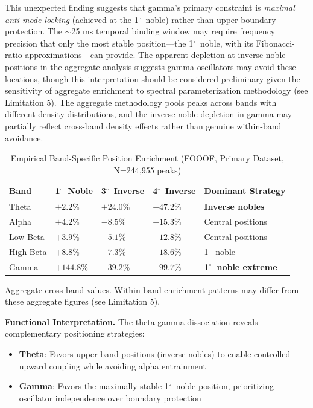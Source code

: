 \documentclass[11pt,a4paper]{article}
\newcommand{\degree}{$^\circ$}  %
\begin{document}
This unexpected finding suggests that gamma's primary constraint is \textit{maximal anti-mode-locking} (achieved at the 1\degree\ noble) rather than upper-boundary protection. The $\sim$25 ms temporal binding window may require frequency precision that only the most stable position---the 1\degree\ noble, with its Fibonacci-ratio approximations---can provide. The apparent depletion at inverse noble positions in the aggregate analysis suggests gamma oscillators may avoid these locations, though this interpretation should be considered preliminary given the sensitivity of aggregate enrichment to spectral parameterization methodology (see Limitation 5). The aggregate methodology pools peaks across bands with different density distributions, and the inverse noble depletion in gamma may partially reflect cross-band density effects rather than genuine within-band avoidance.

\begin{table}[H]
\centering
\caption{Empirical Band-Specific Position Enrichment (FOOOF, Primary Dataset, N=244,955 peaks)}
\label{tab:band_position_empirical}
\begin{tabular}{@{}lllll@{}}
\toprule
Band & 1\degree\ Noble & 3\degree\ Inverse & 4\degree\ Inverse & Dominant Strategy \\
\midrule
Theta & $+2.2\%$ & $+24.0\%$ & $+47.2\%$ & \textbf{Inverse nobles} \\
Alpha & $+4.2\%$ & $-8.5\%$ & $-15.3\%$ & Central positions \\
Low Beta & $+3.9\%$ & $-5.1\%$ & $-12.8\%$ & Central positions \\
High Beta & $+8.8\%$ & $-7.3\%$ & $-18.6\%$ & 1\degree\ noble \\
Gamma & $+144.8\%$ & $-39.2\%$ & $-99.7\%$ & \textbf{1\degree\ noble extreme} \\
\bottomrule
\end{tabular}
\begin{tablenotes}
\small
\item Aggregate cross-band values. Within-band enrichment patterns may differ from these aggregate figures (see Limitation 5).
\end{tablenotes}
\end{table}

\textbf{Functional Interpretation.}
The theta-gamma dissociation reveals complementary positioning strategies:
\begin{itemize}
    \item \textbf{Theta}: Favors upper-band positions (inverse nobles) to enable controlled upward coupling while avoiding alpha entrainment
    \item \textbf{Gamma}: Favors the maximally stable 1\degree\ noble position, prioritizing oscillator independence over boundary protection
\end{itemize}
\end{document}

